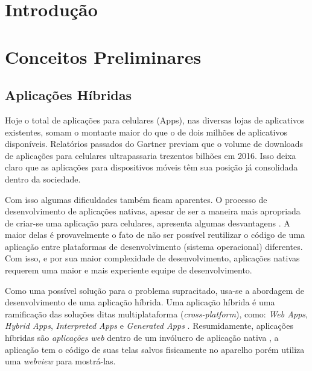 \documentclass[12pt]{report} %
\begin{document}
	\listoftables
		
	\pagebreak
	
	
	\printterms[database=acronym,columns=1,prelocation=hfill,style=align]
	
	\label{lastpretextualpage}
	\pagebreak
	
	
	\justifying
	
\chapter{Introdução}
\label{sec:introducao}


\chapter{Conceitos Preliminares}
\label{sec:conceitos_preliminares}

\section{Aplicações Híbridas}
Hoje o total de aplicações para celulares (Apps), nas diversas lojas de aplicativos existentes, somam o montante maior do que o de dois milhões \cite{malavolta} de aplicativos disponíveis. Relatórios passados do Gartner \cite{gartner} previam que o volume de downloads de aplicações para celulares ultrapassaria trezentos bilhões em 2016. Isso deixa claro que as aplicações para dispositivos móveis têm sua posição já consolidada dentro da sociedade.

Com isso algumas dificuldades também ficam aparentes. O processo de desenvolvimento de aplicações nativas, apesar de ser a maneira mais apropriada de criar-se uma aplicação para celulares, apresenta algumas desvantagens \cite{Xanthopoulos:2013:CAC:2490257.2490292}. A maior delas é provavelmente o fato de não ser possível reutilizar o código de uma aplicação entre plataformas de desenvolvimento (sistema operacional) diferentes. Com isso, e por sua maior complexidade de desenvolvimento, aplicações nativas requerem uma maior e mais experiente equipe de desenvolvimento.

Como uma possível solução para o problema supracitado, usa-se a abordagem de desenvolvimento de uma aplicação híbrida. Uma aplicação híbrida é uma ramificação das soluções ditas multiplataforma (\textit{cross-platform}), como: \textit{Web Apps}, \textit{Hybrid Apps}, \textit{Interpreted Apps} e \textit{Generated Apps} \cite{Xanthopoulos:2013:CAC:2490257.2490292}. Resumidamente, aplicações híbridas são \textit{aplicações web} dentro de um invólucro de aplicação nativa \cite{Serrano:2013:MWA:2553372.2553378}, a aplicação tem o código de suas telas salvos fisicamente no aparelho porém utiliza uma \textit{webview} para mostrá-las. 
\end{document}
